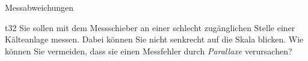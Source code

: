 \begin{aufgabe}[Technologie]{Messabweichungen}
\begin{teilaufgabe}[ohnenummer]{t}{3}{2}
    Sie sollen mit dem Messschieber an einer schlecht zugänglichen Stelle einer
    Kälteanlage messen. Dabei können Sie nicht senkrecht auf die Skala blicken.
    Wie können Sie vermeiden, dass sie einen Messfehler durch \textit{Parallaxe}
    verursachen?
\end{teilaufgabe}
\begin{loesung}
\end{loesung}
\end{aufgabe}
